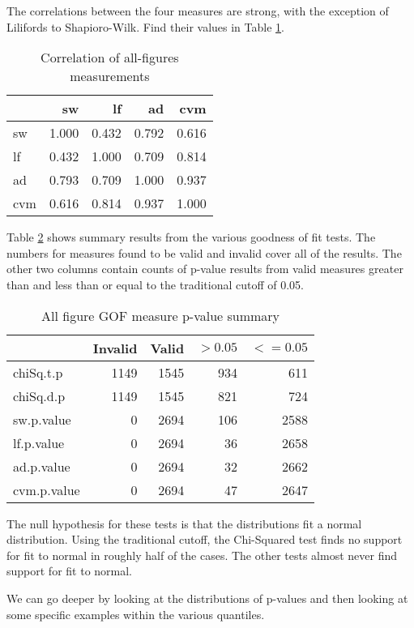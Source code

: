 The correlations between the four measures are strong, with the exception
of Lilifords to Shapioro-Wilk. Find their values in Table \ref{table:allcorr}.

\begin{table}[tbp]
  \begin{tabular}{l | r r r r}
  & sw & lf & ad & cvm \\
   \hline
  sw   & 1.000  & 0.432  & 0.792   & 0.616 \\
  lf   & 0.432  & 1.000  & 0.709   & 0.814 \\
  ad   & 0.793  & 0.709  & 1.000   & 0.937 \\
  cvm  & 0.616  & 0.814  & 0.937   & 1.000 \\
  \end{tabular}
  \caption{Correlation of all-figures measurements}
  \label{table:allcorr}
\end{table}

Table \ref{table:allsumm} shows summary results from the various goodness
of fit tests.
The numbers for measures found to be valid and invalid cover all of the
results.
The other two columns contain counts of p-value results from valid measures
greater than and less than or equal to the traditional cutoff of 0.05.

\begin{table}[tbp]
\centering
\begin{tabular}{l | r r r r}
& Invalid & Valid & $> 0.05$ & $<= 0.05$ \\
 \hline
chiSq.t.p   & 1149 & 1545 &  934 &  611 \\
chiSq.d.p   & 1149 & 1545 &  821 &  724 \\
sw.p.value  &    0 & 2694 &  106 & 2588 \\
lf.p.value  &    0 & 2694 &   36 & 2658 \\
ad.p.value  &    0 & 2694 &   32 & 2662 \\
cvm.p.value &    0 & 2694 &   47 & 2647 \\
\end{tabular}
\caption{All figure GOF measure p-value summary}
\label{table:allsumm}
\end{table}

The null hypothesis for these tests is that the distributions fit a normal
distribution. Using the traditional cutoff,
the Chi-Squared test finds no support for fit to normal in roughly half
of the cases.
The other tests almost never find support for fit to normal.

We can go deeper by looking at the distributions of p-values and then
looking at some specific examples within the various quantiles.

